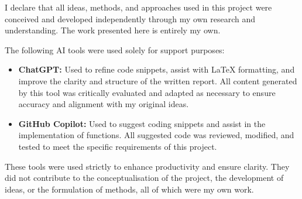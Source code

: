 \documentclass[a4paper,12pt]{article}
\begin{document}
I declare that all ideas, methods, and approaches used in this project were conceived and developed independently through my own research and understanding. The work presented here is entirely my own.

The following AI tools were used solely for support purposes:
\begin{itemize}
    \item \textbf{ChatGPT:} Used to refine code snippets, assist with LaTeX formatting, and improve the clarity and structure of the written report. All content generated by this tool was critically evaluated and adapted as necessary to ensure accuracy and alignment with my original ideas.
    \item \textbf{GitHub Copilot:} Used to suggest coding snippets and assist in the implementation of functions. All suggested code was reviewed, modified, and tested to meet the specific requirements of this project.
\end{itemize}

These tools were used strictly to enhance productivity and ensure clarity. They did not contribute to the conceptualisation of the project, the development of ideas, or the formulation of methods, all of which were my own work.



\printbibliography
\end{document}

